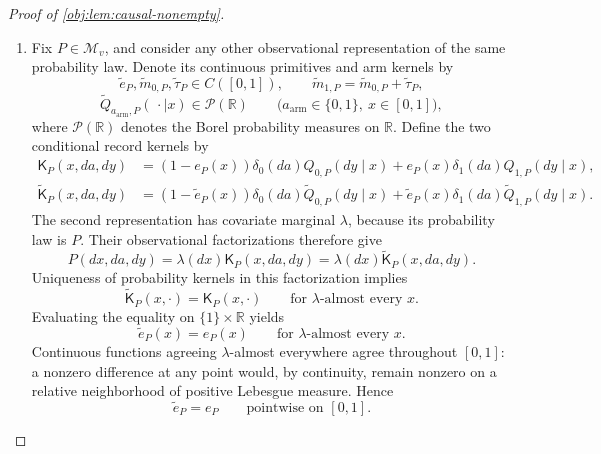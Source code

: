 \begin{proof}[Proof of \cref{obj:lem:causal-nonempty}]
\begin{enumerate}
\item Fix \(P\in\mathcal M_v\), and consider any other observational representation of the same probability law. Denote its continuous primitives and arm kernels by
\[
\widetilde e_P,\widetilde m_{0,P},\widetilde\tau_P\in C([0,1]),
\qquad
\widetilde m_{1,P}
=\widetilde m_{0,P}+\widetilde\tau_P,
\]
\[
\widetilde Q_{a_{\mathrm{arm}},P}(\,\cdot\mid x)
\in\mathcal P(\mathbb R)
\qquad
\bigl(a_{\mathrm{arm}}\in\{0,1\},\ x\in[0,1]\bigr),
\]
where \(\mathcal P(\mathbb R)\) denotes the Borel probability measures on \(\mathbb R\).
Define the two conditional record kernels by
\[
\begin{aligned}
\mathsf K_P(x,da,dy)
&=(1-e_P(x))\delta_0(da)Q_{0,P}(dy\mid x)
  +e_P(x)\delta_1(da)Q_{1,P}(dy\mid x),\\
\widetilde{\mathsf K}_P(x,da,dy)
&=(1-\widetilde e_P(x))\delta_0(da)\widetilde Q_{0,P}(dy\mid x)
  +\widetilde e_P(x)\delta_1(da)\widetilde Q_{1,P}(dy\mid x).
\end{aligned}
\]
The second representation has covariate marginal \(\lambda\), because its probability law is \(P\). Their observational factorizations therefore give
\[
P(dx,da,dy)
=\lambda(dx)\mathsf K_P(x,da,dy)
=\lambda(dx)\widetilde{\mathsf K}_P(x,da,dy).
\]
Uniqueness of probability kernels in this factorization implies
\[
\widetilde{\mathsf K}_P(x,\cdot)
=\mathsf K_P(x,\cdot)
\qquad\text{for \(\lambda\)-almost every }x.
\]
Evaluating the equality on \(\{1\}\times\mathbb R\) yields
\[
\widetilde e_P(x)=e_P(x)
\qquad\text{for \(\lambda\)-almost every }x.
\]
Continuous functions agreeing \(\lambda\)-almost everywhere agree throughout \([0,1]\): a nonzero difference at any point would, by continuity, remain nonzero on a relative neighborhood of positive Lebesgue measure. Hence
\[
\widetilde e_P=e_P
\qquad\text{pointwise on }[0,1].
\]


\end{enumerate}
\end{proof}
